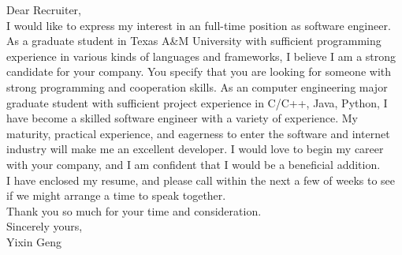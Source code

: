 \documentclass[12pt]{article}
\begin{document}
Dear Recruiter,\\

I would like to express my interest in an full-time position as software engineer.
As a graduate student in Texas A\&M University with sufficient programming experience in
various kinds of languages and frameworks, I believe I am a strong candidate for your company.
You specify that you are looking for someone with strong programming and cooperation skills.
As an computer engineering major graduate student with sufficient project experience in
C/C++, Java, Python, I have become a skilled software engineer with a variety of experience.
My maturity, practical experience, and eagerness to enter the software and internet industry
will make me an excellent developer. I would love to begin my career with your company, and
I am confident that I would be a beneficial addition.\\

I have enclosed my resume, and please call within the next a few of weeks to see if we might
arrange a time to speak together.\\

Thank you so much for your time and consideration.\\

Sincerely yours,\\

Yixin Geng
\end{document}
